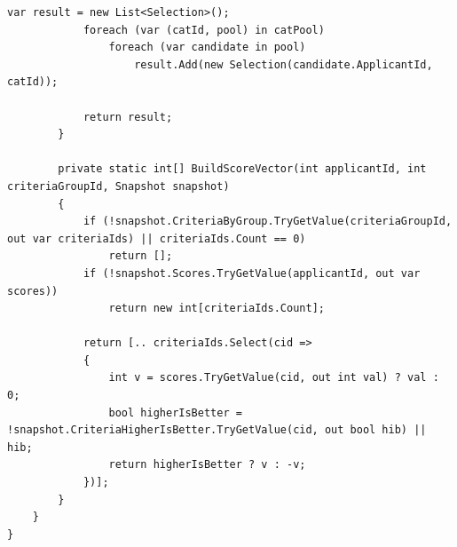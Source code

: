 \begin{lstlisting}[style=csharpstyle]
            var result = new List<Selection>();
            foreach (var (catId, pool) in catPool)
                foreach (var candidate in pool)
                    result.Add(new Selection(candidate.ApplicantId, catId));

            return result;
        }

        private static int[] BuildScoreVector(int applicantId, int criteriaGroupId, Snapshot snapshot)
        {
            if (!snapshot.CriteriaByGroup.TryGetValue(criteriaGroupId, out var criteriaIds) || criteriaIds.Count == 0)
                return [];
            if (!snapshot.Scores.TryGetValue(applicantId, out var scores))
                return new int[criteriaIds.Count];

            return [.. criteriaIds.Select(cid =>
            {
                int v = scores.TryGetValue(cid, out int val) ? val : 0;
                bool higherIsBetter = !snapshot.CriteriaHigherIsBetter.TryGetValue(cid, out bool hib) || hib;
                return higherIsBetter ? v : -v;
            })];
        }
    }
}
\end{lstlisting}

